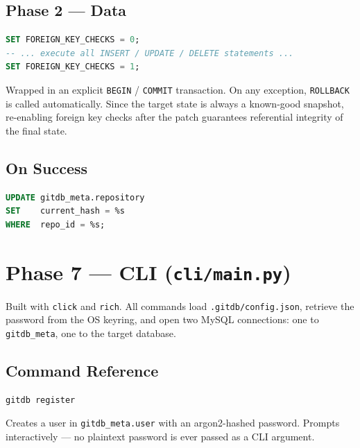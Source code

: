 \documentclass[12pt, a4paper]{article}
\begin{document}
\subsection{Phase 2 --- Data}

\begin{tcolorbox}[commandbox, title=Phase 2 --- Data Patch (Transactional)]
\begin{lstlisting}[language=SQL]
SET FOREIGN_KEY_CHECKS = 0;
-- ... execute all INSERT / UPDATE / DELETE statements ...
SET FOREIGN_KEY_CHECKS = 1;
\end{lstlisting}
\textcolor{codetext}{\small Wrapped in an explicit \texttt{BEGIN} /
\texttt{COMMIT} transaction. On any exception, \texttt{ROLLBACK} is called
automatically. Since the target state is always a known-good snapshot,
re-enabling foreign key checks after the patch guarantees referential
integrity of the final state.}
\end{tcolorbox}

\subsection{On Success}

\begin{tcolorbox}[commandbox, title=HEAD Pointer Update]
\begin{lstlisting}[language=SQL]
UPDATE gitdb_meta.repository
SET    current_hash = %s
WHERE  repo_id = %s;
\end{lstlisting}
\end{tcolorbox}

\section{Phase 7 --- CLI (\texttt{cli/main.py})}

Built with \texttt{click} and \texttt{rich}. All commands load
\texttt{.gitdb/config.json}, retrieve the password from the OS keyring,
and open two MySQL connections: one to \texttt{gitdb\_meta}, one to the
target database.

\subsection{Command Reference}

\begin{tcolorbox}[commandbox, title=\texttt{gitdb register}]
\begin{lstlisting}
gitdb register
\end{lstlisting}
\textcolor{codetext}{\small Creates a user in \texttt{gitdb\_meta.user}
with an argon2-hashed password. Prompts interactively --- no plaintext
password is ever passed as a CLI argument.}
\end{tcolorbox}
\end{document}
